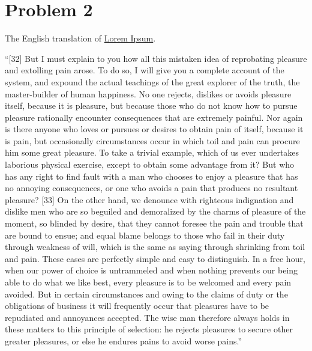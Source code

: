 \documentclass[letterpaper]{article}
\begin{document}
\section*{Problem 2}
The English translation of \href{https://en.wikipedia.org/wiki/Lorem_ipsum#Source_text}{Lorem Ipsum}.
\begin{ddanger}
    ``[32] But I must explain to you how all this mistaken idea of reprobating pleasure and extolling pain arose.
    To do so, I will give you a complete account of the system, and expound the actual teachings of the great explorer of the truth, the master-builder of human happiness.
    No one rejects, dislikes or avoids pleasure itself, because it is pleasure, but because those who do not know how to pursue pleasure rationally encounter consequences that are extremely painful.
    Nor again is there anyone who loves or pursues or desires to obtain pain of itself, because it is pain, but occasionally circumstances occur in which toil and pain can procure him some great pleasure.
    To take a trivial example, which of us ever undertakes laborious physical exercise, except to obtain some advantage from it?
    But who has any right to find fault with a man who chooses to enjoy a pleasure that has no annoying consequences, or one who avoids a pain that produces no resultant pleasure?
    [33] On the other hand, we denounce with righteous indignation and dislike men who are so beguiled and demoralized by the charms of pleasure of the moment, so blinded by desire, that they cannot foresee the pain and trouble that are bound to ensue; and equal blame belongs to those who fail in their duty through weakness of will, which is the same as saying through shrinking from toil and pain.
    These cases are perfectly simple and easy to distinguish.
    In a free hour, when our power of choice is untrammeled and when nothing prevents our being able to do what we like best, every pleasure is to be welcomed and every pain avoided.
    But in certain circumstances and owing to the claims of duty or the obligations of business it will frequently occur that pleasures have to be repudiated and annoyances accepted.
    The wise man therefore always holds in these matters to this principle of selection: he rejects pleasures to secure other greater pleasures, or else he endures pains to avoid worse pains.''~\cite{book:lorem_ipsum}\hfill{}
\end{ddanger}

\printbibliography
\end{document}
